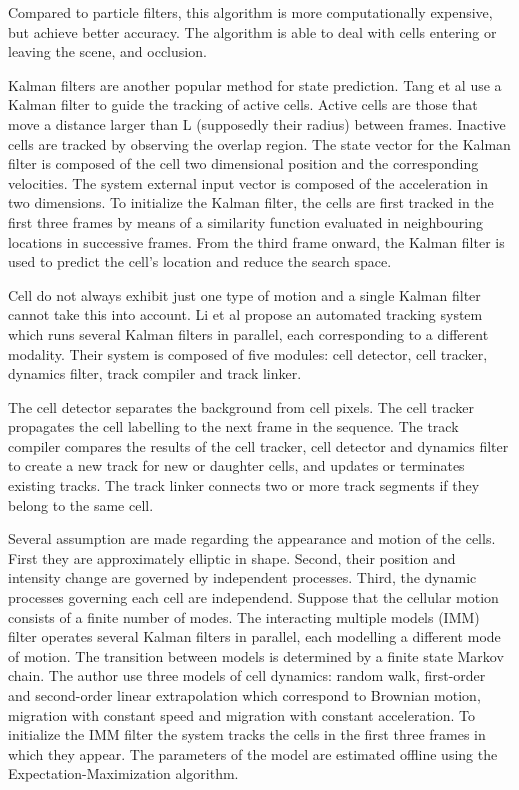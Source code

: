 \documentclass[12pt,a4paper,openany]{book}
\begin{document}
Compared to particle filters, this algorithm is more computationally expensive, but achieve better accuracy. The algorithm is able to deal with cells entering or leaving the scene, and occlusion.

Kalman filters are another popular method for state prediction. Tang et al \cite{tang} use a Kalman filter to guide the tracking of active cells. Active cells are those that move a distance larger than L (supposedly their radius) between frames. Inactive cells are tracked by observing the overlap region. The state vector for the Kalman filter is composed of the cell two dimensional position and the corresponding velocities. The system external input vector is composed of the acceleration in two dimensions. To initialize the Kalman filter, the cells are first tracked in the first three frames by means of a similarity function evaluated in neighbouring locations in successive frames. From the third frame onward, the Kalman filter is used to predict the cell's location and reduce the search space.

Cell do not always exhibit just one type of motion and a single Kalman filter cannot take this into account. Li et al \cite{li07} propose an automated tracking system which runs several Kalman filters in parallel, each corresponding to a different modality. Their system is composed of five modules: cell detector, cell tracker, dynamics filter, track compiler and track linker.

The cell detector separates the background from cell pixels. The cell tracker propagates the cell labelling to the next frame in the sequence. The track compiler compares the results of the cell tracker, cell detector and dynamics filter to create a new track for new or daughter cells, and updates or terminates existing tracks. The track linker connects two or more track segments if they belong to the same cell. 

Several assumption are made regarding the appearance and motion of the cells. First they are approximately elliptic in shape. Second, their position and intensity change are governed by independent processes. Third, the dynamic processes governing each cell are independend. Suppose that the cellular motion consists of a finite number of modes. The interacting multiple models (IMM) filter operates several Kalman filters in parallel, each modelling a different mode of motion. The transition between models is determined by a finite state Markov chain. The author use three models of cell dynamics: random walk, first-order and second-order linear extrapolation which correspond to Brownian motion, migration with constant speed and migration with constant acceleration. To initialize the IMM filter the system tracks the cells in the first three frames in which they appear. The parameters of the model are estimated offline using the Expectation-Maximization algorithm.
\end{document}
